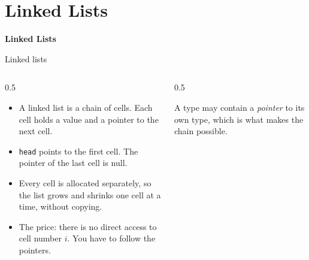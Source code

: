 \newcommand{\llcell}[4][]{%
  \node[llval, #1] (#2v) at (#3) {#4};
  \node[llnext, #1, anchor=west] (#2n) at (#2v.east) {};
  \fill (#2n.center) circle (1.3pt);
}

\section{Linked Lists}

\begin{frame}
	\centering
	\Huge \textbf{Linked Lists}
\end{frame}

\begin{frame}[fragile]{Linked lists}
  \centering

  \vspace{0.5em}
  \begin{columns}[T]
    \begin{column}{0.5\textwidth}
      \begin{itemize}
        \item A linked list is a chain of cells. Each cell holds a value and a pointer to the next cell.
        \item \texttt{head} points to the first cell. The pointer of the last cell is null.
        \item Every cell is allocated separately, so the list grows and shrinks one cell at a time, without copying.
        \item The price: there is no direct access to cell number $i$. You have to follow the pointers.
      \end{itemize}
    \end{column}

    \begin{column}{0.5\textwidth}
      
      A type may contain a \emph{pointer} to its own type, which is what makes the chain possible.
    \end{column}
  \end{columns}
\end{frame}


